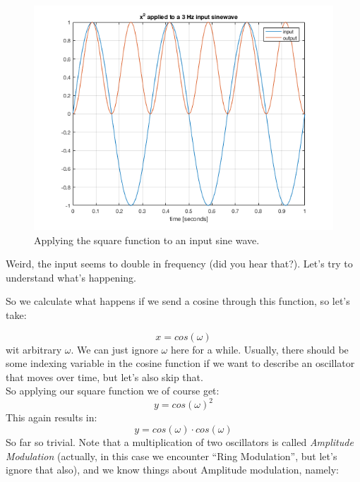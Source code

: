 \begin{figure}[H]
	\begin{center}
		\includegraphics[width = 14cm]{img/sinSquared.png}
		\caption{Applying the square function to an input sine wave.}
		\label{fig:sinSquared}
	\end{center}
\end{figure}


Weird, the input seems to double in frequency (did you hear that?). Let's try to understand what's happening.\

So we calculate what happens if we send a cosine through this function, so let's take:

\begin{equation}
x = cos(\omega)
\end{equation}
wit arbitrary $\omega$. We can just ignore $\omega$ here for a while. Usually, there should be some indexing variable in the cosine function if we want to describe an oscillator that moves over time, but let's also skip that.\\
So applying our square function we of course get:
\begin{equation}
y = cos(\omega)^2
\end{equation}
This again results in:
\begin{equation}
y = cos(\omega) \cdot cos(\omega)
\end{equation}
So far so trivial. Note that a multiplication of two oscillators is called \textit{Amplitude Modulation} (actually, in this case we encounter ``Ring Modulation'', but let's ignore that also), and we know things about Amplitude modulation, namely:\

